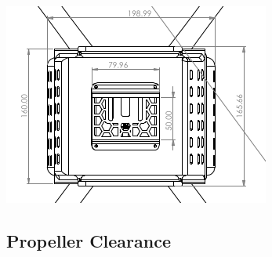 \documentclass[12pt]{report}
\begin{document}
      \begin{center}
      \begin{minipage}{0.5\textwidth}
          \centering
          \includegraphics[width=1\linewidth]{hub2.png}
      \end{minipage}
      \end{center}
      \subsection*{Propeller Clearance}
      
\end{document}
